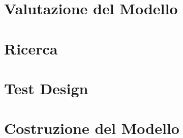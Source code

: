 \section{Valutazione del Modello}

\section{Ricerca}

\section{Test Design}

\section{Costruzione del Modello}

